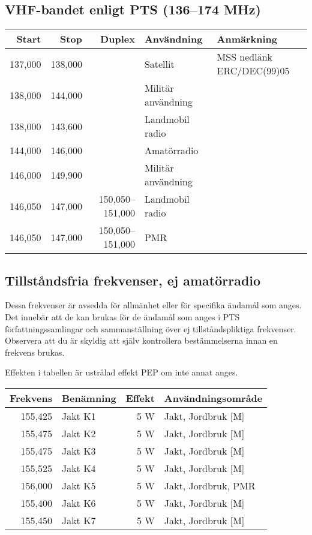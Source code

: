 \documentclass[12pt,swedish,a4paper]{article}
\begin{document}
\subsection{VHF-bandet enligt PTS (136--174 MHz)}
\begin{tabular}{rrrll}
	  Start &    Stop &           Duplex & Användning         & Anmärkning                \\ \hline
	137,000 & 138,000 &                  & Satellit           & MSS nedlänk ERC/DEC(99)05 \\
	138,000 & 144,000 &                  & Militär användning &  \\
	138,000 & 143,600 &                  & Landmobil radio    &  \\
	144,000 & 146,000 &                  & Amatörradio        &  \\
	146,000 & 149,900 &                  & Militär användning &  \\
	146,050 & 147,000 & 150,050--151,000 & Landmobil radio    &  \\
	146,050 & 147,000 & 150,050--151,000 & PMR                &
\end{tabular}
\normalsize

\subsection{Tillståndsfria frekvenser, ej amatörradio}

Dessa frekvenser är avsedda för allmänhet eller för specifika ända\-mål som anges. Det innebär att de kan brukas för de ändamål som anges i PTS författningssamlingar och sammanställning över ej tillståndspliktiga frekvenser. Observera att du är skyldig att själv kontrollera bestämmelserna innan en frekvens brukas.

Effekten i tabellen är ustrålad effekt PEP om inte annat anges.

\begin{tabular}{rlrl}
	Frekvens & Benämning & Effekt & Användningsområde   \\ \hline
	 155,425 & Jakt K1   &    5 W & Jakt, Jordbruk [M]  \\
	 155,475 & Jakt K2   &    5 W & Jakt, Jordbruk [M]  \\
	 155,475 & Jakt K3   &    5 W & Jakt, Jordbruk [M]  \\
	 155,525 & Jakt K4   &    5 W & Jakt, Jordbruk [M]  \\
	 156,000 & Jakt K5   &    5 W & Jakt, Jordbruk, PMR \\
	 155,400 & Jakt K6   &    5 W & Jakt, Jordbruk [M]  \\
	 155,450 & Jakt K7   &    5 W & Jakt, Jordbruk [M]
\end{tabular}
\end{document}
